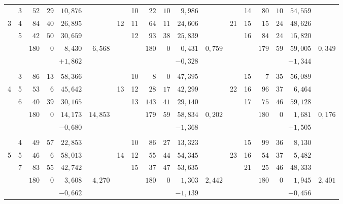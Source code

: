 \begin{center}
\begin{tabular}{|r|r|r@{\;}r@{\;}r|r||r|r|r@{\;}r@{\;}r|r||r|r|r@{\;}r@{\;}r|r|}
 & 3 & $52$ & $29$ & $10{,}876$ &  &  & 10 & $22$ & $10$ & $9{,}986$ &  &  & 14 & $80$ & $10$ & $54{,}559$ & \\
3 & 4 & $84$ & $40$ & $26{,}895$ &  & 12 & 11 & $64$ & $11$ & $24{,}606$ &  & 21 & 15 & $15$ & $24$ & $48{,}626$ & \\
 & 5 & $42$ & $50$ & $30{,}659$ &  &  & 12 & $93$ & $38$ & $25{,}839$ &  &  & 16 & $84$ & $24$ & $15{,}820$ & \\
\cline{3-5}\cline{9-11}\cline{15-17}
 &  & $180$ & $0$ & $8{,}430$ & $6{,}568$ &  &  & $180$ & $0$ & $0{,}431$ & $0{,}759$ &  &  & $179$ & $59$ & $59{,}005$ & $0{,}349$\\
 &  & \multicolumn{3}{r|}{$+1{,}862$} &  &  &  & \multicolumn{3}{r|}{$-0{,}328$} &  &  &  & \multicolumn{3}{r|}{$-1{,}344$} & \\
 &  &  &  &  &  &  &  &  &  &  &  &  &  &  &  &  & \\
 & 3 & $86$ & $13$ & $58{,}366$ &  &  & 10 & $8$ & $0$ & $47{,}395$ &  &  & 15 & $7$ & $35$ & $56{,}089$ & \\
4 & 5 & $53$ & $6$ & $45{,}642$ &  & 13 & 12 & $28$ & $17$ & $42{,}299$ &  & 22 & 16 & $96$ & $37$ & $6{,}464$ & \\
 & 6 & $40$ & $39$ & $30{,}165$ &  &  & 13 & $143$ & $41$ & $29{,}140$ &  &  & 17 & $75$ & $46$ & $59{,}128$ & \\
\cline{3-5}\cline{9-11}\cline{15-17}
 &  & $180$ & $0$ & $14{,}173$ & $14{,}853$ &  &  & $179$ & $59$ & $58{,}834$ & $0{,}202$ &  &  & $180$ & $0$ & $1{,}681$ & $0{,}176$\\
 &  & \multicolumn{3}{r|}{$-0{,}680$} &  &  &  & \multicolumn{3}{r|}{$-1{,}368$} &  &  &  & \multicolumn{3}{r|}{$+1{,}505$} & \\
 &  &  &  &  &  &  &  &  &  &  &  &  &  &  &  &  & \\
 & 4 & $49$ & $57$ & $22{,}853$ &  &  & 10 & $86$ & $27$ & $13{,}323$ &  &  & 15 & $99$ & $36$ & $8{,}130$ & \\
5 & 5 & $46$ & $6$ & $58{,}013$ &  & 14 & 12 & $55$ & $44$ & $54{,}345$ &  & 23 & 16 & $54$ & $37$ & $5{,}482$ & \\
 & 7 & $83$ & $55$ & $42{,}742$ &  &  & 15 & $37$ & $47$ & $53{,}635$ &  &  & 21 & $25$ & $46$ & $48{,}333$ & \\
\cline{3-5}\cline{9-11}\cline{15-17}
 &  & $180$ & $0$ & $3{,}608$ & $4{,}270$ &  &  & $180$ & $0$ & $1{,}303$ & $2{,}442$ &  &  & $180$ & $0$ & $1{,}945$ & $2{,}401$\\
 &  & \multicolumn{3}{r|}{$-0{,}662$} &  &  &  & \multicolumn{3}{r|}{$-1{,}139$} &  &  &  & \multicolumn{3}{r|}{$-0{,}456$} & \\

\end{tabular}
\end{center}
